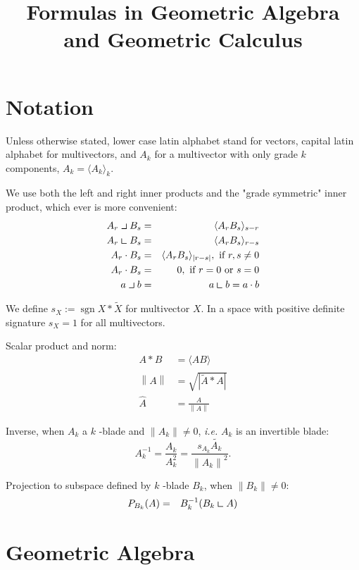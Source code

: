 \documentclass[a4paper,12pt]{article}
\title{Formulas in Geometric Algebra and Geometric Calculus}
\author{}
\newcommand{\grade}[2]{\ensuremath{\langle#2\rangle_{#1}}}
\newcommand{\reverse}[1]{\tilde{#1}} %
\newcommand{\linner}{\mathbin{\ensuremath{\scalebox{1.4}{$\lrcorner$}}}}
\newcommand{\rinner}{\mathbin{\ensuremath{\scalebox{1.4}{$\llcorner$}}}}
\providecommand{\abs}[1]{\lvert#1\rvert}
\providecommand{\norm}[1]{\left\lVert#1\right\rVert}
\providecommand{\normed}[1]{\hat{#1}}
\DeclareMathOperator{\sign}{sgn}
\providecommand{\signX}[1]{\ensuremath{s_{#1}}}
\begin{document}
\maketitle

\section{Notation}

Unless otherwise stated, lower case latin alphabet stand for vectors, capital latin alphabet for multivectors, and $A_k$ for a multivector with only grade $k$ components, $A_k = \grade{k}{A_k}$.

We use both the left and right inner products and the "grade symmetric" inner product, which ever is more convenient:
\begin{eqnarray}
A_r \linner B_s &=& \grade{s-r}{A_r B_s}\\
A_r \rinner B_s &=& \grade{r-s}{A_r B_s}\\
A_r \cdot B_s &=& \grade{\abs{r-s}}{A_r B_s},\ \textrm{if}\ r, s \neq 0\\
A_r \cdot B_s &=& 0,\ \textrm{if}\ r = 0\ \textrm{or}\ s = 0\\
a \linner b &=& a \rinner b = a \cdot b
\end{eqnarray}

We define $\signX{X} := \sign{X * \reverse{X}}$ for multivector $X$.
In a space with positive definite signature $\signX{X} = 1$ for all multivectors.

Scalar product and norm:
\begin{align}
 A * B &= \grade{}{AB}\\
 \norm{A} &= \sqrt{|\reverse{A} * A|}\\
 \normed{A} &= \frac{A}{\norm{A}}
\end{align}

Inverse, when $A_k$ a $k$ -blade and $\norm{A_k} \neq 0$, \emph{i.e.} $A_k$ is an invertible blade:
\begin{equation}
A_k^{-1} = \frac{A_k}{A_k^2} = \frac{\signX{A_k}\reverse{A_k}}{\norm{A_k}^2}.
\end{equation}

Projection to subspace defined by $k$ -blade $B_k$, when $\norm{B_k} \neq 0$:
\begin{eqnarray}
 P_{B_k}(A) &=& B^{-1}_{k}(B_k \rinner A)
\end{eqnarray}

\section{Geometric Algebra}
\end{document}

